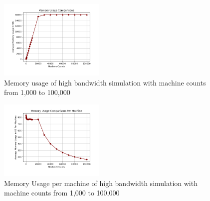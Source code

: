 \documentclass[journal]{IEEEtran} %
\newcommand{\imagewidth}{0.45\textwidth}
\begin{document}
\begin{figure}[H]
    \centerline{\includegraphics[width=\imagewidth]{Images/mem_usage_high_band.png}}
    \caption{Memory usage of high bandwidth simulation with machine counts from 1,000 to 100,000}
    \label{fig:mem_usage_per_machine_high_band_thousand_to_hundred_thousand}
\end{figure}

\begin{figure}[H]
    \centerline{\includegraphics[width=\imagewidth]{Images/mem_usage_per_machine_high_band_thousand_to_hundred_thousand.png}}
    \caption{Memory Usage per machine of high bandwidth simulation with machine counts from 1,000 to 100,000}
    \label{fig:mem_usage_per_machine_high_band_thousand_to_hundred_thousand}
\end{figure}
\end{document}
